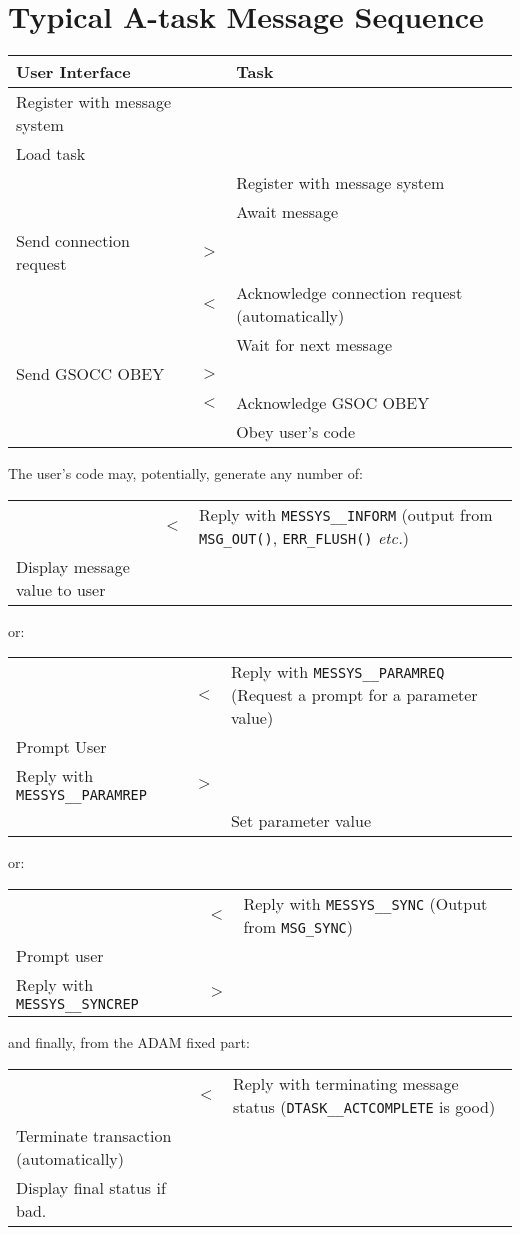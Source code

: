 \documentclass[twoside,11pt,nolof]{starlink}
\begin{document}
\section{Typical A-task Message Sequence}
\begin{center}
\begin{tabular}{|p{65mm}|c|p{75mm}|}
\hline
User Interface & & Task\\
\hline
Register with message system & &\\
Load task & &\\
& & Register with message system\\
& & Await message\\
Send connection request & $>$ &\\
& $<$ & Acknowledge connection request (automatically)\\
& & Wait for next message\\
Send GSOCC OBEY & $>$ &\\
& $<$ & Acknowledge GSOC OBEY \\
& & Obey user's code \\
\hline
\end{tabular}

The user's code may, potentially, generate any number of:

\begin{tabular}{|p{65mm}|c|p{75mm}|}
\hline
& $<$ & Reply with \texttt{MESSYS\_\_INFORM}
(output from \texttt{MSG\_OUT()}, \texttt{ERR\_FLUSH()} \textit{etc.})\\
Display message value to user & &\\
\hline
\end{tabular}

or:

\begin{tabular}{|p{65mm}|c|p{75mm}|}
\hline
& $<$ & Reply with \texttt{MESSYS\_\_PARAMREQ}
(Request a prompt for a parameter value)\\
Prompt User & & \\
Reply with \texttt{MESSYS\_\_PARAMREP} & $>$ & \\
& & Set parameter value\\
\hline
\end{tabular}

or:

\begin{tabular}{|p{65mm}|c|p{75mm}|}
\hline
& $<$ & Reply with \texttt{MESSYS\_\_SYNC} (Output from \texttt{MSG\_SYNC})\\
Prompt user & & \\
Reply with \texttt{MESSYS\_\_SYNCREP} &$>$ & \\
\hline
\end{tabular}

and finally, from the ADAM fixed part:

\begin{tabular}{|p{65mm}|c|p{75mm}|}
\hline
& $<$ & Reply with terminating message status
(\texttt{DTASK\_\_ACTCOMPLETE} is good)\\
Terminate transaction (automatically) & & \\
Display final status if bad. & & \\
\hline
\end{tabular}
\end{center}
\end{document}
